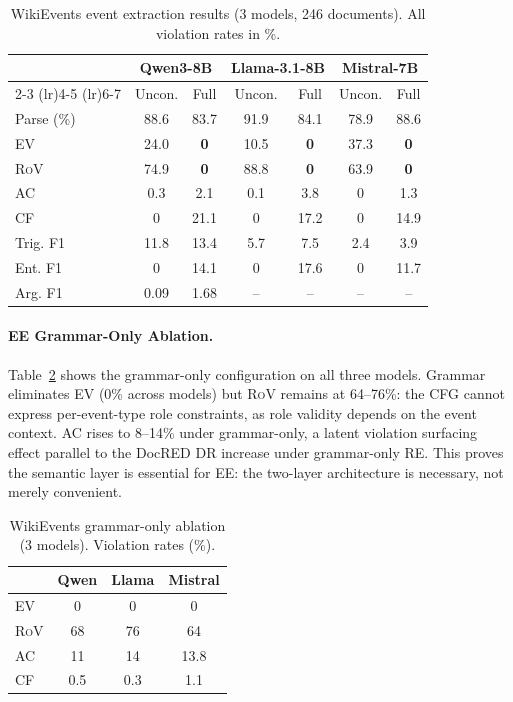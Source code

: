 \documentclass[11pt,a4paper]{article}
\newcommand{\drsym}{\textsc{DR}}
\newcommand{\cfsym}{\textsc{CF}}
\newcommand{\evsym}{\textsc{EV}}
\newcommand{\rovsym}{\textsc{RoV}}
\newcommand{\acsym}{\textsc{AC}}
\begin{document}
\begin{table}[t]
\centering
\caption{WikiEvents event extraction results (3 models, 246 documents). All violation rates in \%.}
\label{tab:ee-main}
\small
\setlength{\tabcolsep}{3pt}
\begin{tabular}{lcccccc}
\toprule
& \multicolumn{2}{c}{\textbf{Qwen3-8B}} & \multicolumn{2}{c}{\textbf{Llama-3.1-8B}} & \multicolumn{2}{c}{\textbf{Mistral-7B}} \\
\cmidrule(lr){2-3} \cmidrule(lr){4-5} \cmidrule(lr){6-7}
& Uncon. & Full & Uncon. & Full & Uncon. & Full \\
\midrule
Parse (\%) & 88.6 & 83.7 & 91.9 & 84.1 & 78.9 & 88.6 \\
\evsym{} & 24.0 & \textbf{0} & 10.5 & \textbf{0} & 37.3 & \textbf{0} \\
\rovsym{} & 74.9 & \textbf{0} & 88.8 & \textbf{0} & 63.9 & \textbf{0} \\
\acsym{} & 0.3 & 2.1 & 0.1 & 3.8 & 0 & 1.3 \\
\cfsym{} & 0 & 21.1 & 0 & 17.2 & 0 & 14.9 \\
\midrule
Trig. F1 & 11.8 & 13.4 & 5.7 & 7.5 & 2.4 & 3.9 \\
Ent. F1 & 0 & 14.1 & 0 & 17.6 & 0 & 11.7 \\
Arg. F1 & 0.09 & 1.68 & -- & -- & -- & -- \\
\bottomrule
\end{tabular}
\end{table}

\paragraph{EE Grammar-Only Ablation.}
Table~\ref{tab:ee-ablation} shows the grammar-only configuration on all three models. Grammar eliminates \evsym{} (0\% across models) but \rovsym{} remains at 64--76\%: the CFG cannot express per-event-type role constraints, as role validity depends on the event context. \acsym{} rises to 8--14\% under grammar-only, a latent violation surfacing effect parallel to the DocRED \drsym{} increase under grammar-only RE. This proves the semantic layer is essential for EE: the two-layer architecture is necessary, not merely convenient.

\begin{table}[t]
\centering
\caption{WikiEvents grammar-only ablation (3 models). Violation rates (\%).}
\label{tab:ee-ablation}
\small
\begin{tabular}{lccc}
\toprule
& \textbf{Qwen} & \textbf{Llama} & \textbf{Mistral} \\
\midrule
\evsym{} & 0 & 0 & 0 \\
\rovsym{} & 68 & 76 & 64 \\
\acsym{} & 11 & 14 & 13.8 \\
\cfsym{} & 0.5 & 0.3 & 1.1 \\
\bottomrule
\end{tabular}
\end{table}
\end{document}
